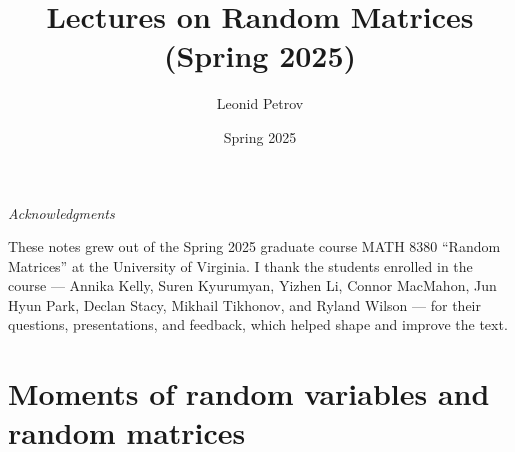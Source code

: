 \documentclass[letterpaper,11pt,oneside,reqno]{book}
\numberwithin{equation}{chapter}  %
\theoremstyle{definition}
\begin{document}
\title{Lectures on Random Matrices (Spring 2025)}
\author{Leonid Petrov}
\date{Spring 2025}
\maketitle

\begin{center}
\textit{Acknowledgments}
\end{center}
\noindent
These notes grew out of the Spring 2025 graduate course MATH 8380 ``Random Matrices'' at the University of Virginia. I thank the students enrolled in the course --- Annika Kelly, Suren Kyurumyan, Yizhen Li, Connor MacMahon, Jun Hyun Park, Declan Stacy, Mikhail Tikhonov, and Ryland Wilson --- for their questions, presentations, and feedback, which helped shape and improve the text.

\tableofcontents

\chapter{Moments of random variables and random
matrices}
\label{chap:lecture1}
\end{document}
